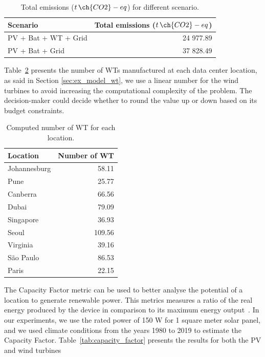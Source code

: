 \begin{table}[h]  
  \caption{Total emissions ($t\,\ch{CO2}-eq$) for different scenario. }\label{tab:total_wind_and_pv_co2} \centering  
  \begin{tabular}{|l|r|}
  \hline    
  \textbf{Scenario} &   \textbf{Total emissions ($t\,\ch{CO2}-eq$)} \\
  \hline    
  PV + Bat + WT + Grid  & 24 977.89 \\    
  \hline
  PV + Bat + Grid       & 37 828.49 \\    
  \hline
\end{tabular}  
\end{table}


Table~\ref{tab:results_wt} presents the number of WTs manufactured at each data center location, as said in Section \ref{sec:ex_model_wt}, we use a linear number for the wind turbines to avoid increasing the computational complexity of the problem. The decision-maker could decide whether to round the value up or down based on its budget constraints.


\begin{table}[h]
  \caption{Computed number of WT for each location.}\label{tab:results_wt} \centering
  \begin{tabular}{|l|r|}
  \hline
    
  \textbf{Location} &   \textbf{Number of WT} \\
  \hline
  Johannesburg & 58.11   \\
  \hline
  Pune  & 25.77 \\
  \hline
  Canberra  & 66.56 \\
  \hline
  Dubai   &  79.09  \\
  \hline
  Singapore & 36.93  \\
  \hline     
  Seoul    & 109.56  \\
  \hline
  Virginia   & 39.16 \\
  \hline
  São Paulo   & 86.53 \\
  \hline 
  Paris    &   22.15 \\
  \hline
  
\end{tabular}  
\end{table}

The Capacity Factor metric can be used to better analyse the potential of a location to generate renewable power. This metrics measures a ratio of the real energy produced by the device in comparison to its maximum energy output~\cite{NREL_2012_capacityfactor}. In our experiments, we use the rated power of 150 W for 1 square meter solar panel, and we used climate conditions from the years 1980 to 2019 to estimate the Capacity Factor. Table~\ref{tab:capacity_factor} presents the results for both the PV and wind turbines


